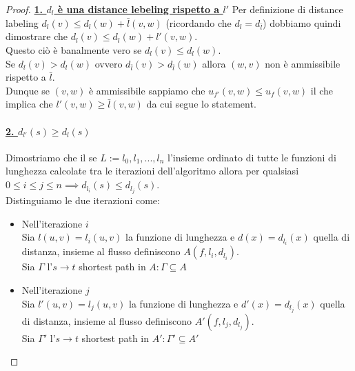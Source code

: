 \documentclass[a4paper, 11pt]{report}
\begin{document}
    \begin{proof}
        \textbf{\underline{1. $d_l$ è una distance lebeling rispetto a $l'$}}
            Per definizione di distance labeling $d_l(v) \le d_l(w) + \bar{l}(v,w)$ (ricordando che $d_l = d_{\bar{l}}$) 
            dobbiamo quindi dimostrare che  $d_l(v) \le d_l(w) + l'(v,w)$.\\
            Questo ciò è banalmente vero se $d_l(v) \le d_l(w)$.\\
            Se $d_l(v) > d_l(w)$ ovvero $d_{\bar{l}}(v) > d_{\bar{l}}(w)$ allora $(w,v)$ non è ammissibile rispetto a $\bar{l}$.\\
            Dunque se $(v,w)$ è ammissibile sappiamo che $u_{f'}(v,w)\le u_{f}(v,w)$ il che implica che \colorbox{yellow!40!white}{$l'(v,w)\ge \bar{l}(v,w)$} da cui segue lo statement.

            \paragraph*{\underline{2. $d_{l'}(s) \ge d_l(s)$}}

            Dimostriamo che il se $L:= {l_0, l_1, ..., l_n}$ l'insieme ordinato di tutte le funzioni di lunghezza
            calcolate tra le iterazioni dell'algoritmo allora per qualsiasi $0 \le i \le j \le n \implies d_{l_i}(s) \le d_{l_j}(s)$.\\
            Distinguiamo le due iterazioni come:
            \begin{itemize}
                \item Nell'iterazione $i$\\
                Sia $l(u,v) = l_i(u,v)$ la funzione di lunghezza e $d(x) = d_{l_i}(x)$ quella di distanza, insieme al flusso definiscono $A(f, l_i, d_{l_i})$.\\ Sia $\Gamma$ l'$s\rightarrow t$ shortest path in $A: \Gamma \subseteq A$
                \item Nell'iterazione $j$\\
                Sia $l'(u,v) = l_j(u,v)$ la funzione di lunghezza e $d'(x) = d_{l_j}(x)$ quella di distanza, insieme al flusso definiscono $A'(f, l_j, d_{l_j})$.\\ Sia $\Gamma'$ l'$s\rightarrow t$ shortest path in $A': \Gamma' \subseteq A'$
            \end{itemize}
            

\end{proof}
\end{document}

